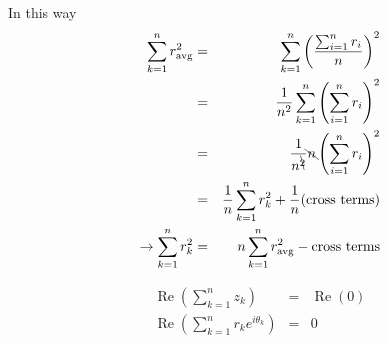 \documentclass[aps,preprint,preprintnumbers,nofootinbib,showpacs,prd]{revtex4-1}
\newcommand{\nbea}{\begin{eqnarray*}}
\newcommand{\neea}{\end{eqnarray*}}
\DeclareMathOperator{\re}{Re}
\begin{document}
In this way
%
\nbea
\sum_{k=1}^{n} r^2_{\rm avg} & = & \sum_{k=1}^{n} \left ( \frac{\sum_{i=1}^{n} r_i}{n} \right ) ^2 \\
& = & \frac{1}{n^2} \sum_{k=1}^{n} \left ( \sum_{i=1}^{n} r_i \right ) ^2 \\
& = & \frac{1}{n^{\bcancel{2}}} \bcancel{n} \left ( \sum_{i=1}^{n} r_i \right ) ^2 \\
& = & \frac{1}{n} \sum_{k=1}^{n} r_k^2  + \frac{1}{n} ({\rm cross~terms}) \\
\to \sum_{k=1}^{n} r_k^2 & = & n \sum_{k=1}^{n} r^2_{\rm avg} - {\rm cross~terms}
\neea
%




%
\nbea
\re \left (\sum_{k=1}^n z_k \right ) & = & \re (0) \\
\re \left ( \sum_{k=1}^n r_k e^{i\theta_k} \right ) & = & 0
\neea
%
\end{document}
